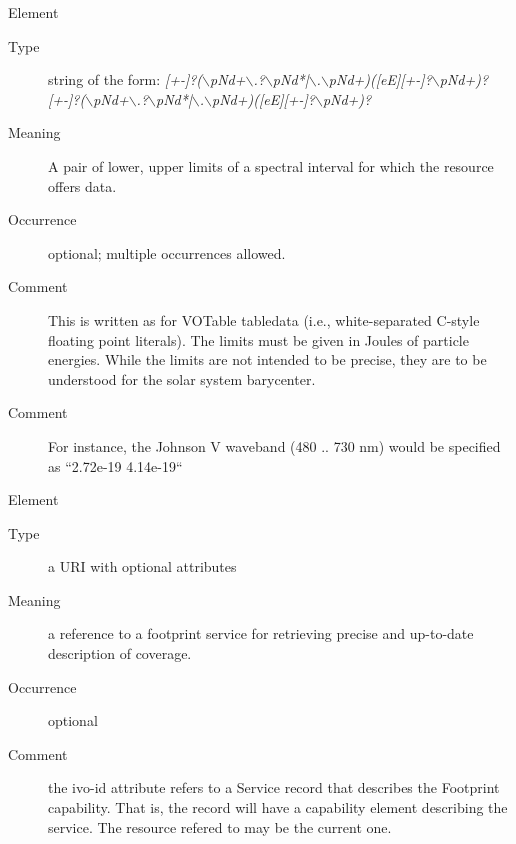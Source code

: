 \documentclass[11pt,a4paper]{ivoa}
\begin{document}
\begin{generated}
\begin{bigdescription}
\begin{description}
\end{description}
\item[Element \xmlel{spectral}]
\begin{description}
\item[Type] string of the form: \emph{[+-]?($\backslash$p{Nd}+$\backslash$.?$\backslash$p{Nd}*|$\backslash$.$\backslash$p{Nd}+)([eE][+-]?$\backslash$p{Nd}+)? [+-]?($\backslash$p{Nd}+$\backslash$.?$\backslash$p{Nd}*|$\backslash$.$\backslash$p{Nd}+)([eE][+-]?$\backslash$p{Nd}+)?}
\item[Meaning] 
                  A pair of lower, upper limits of a spectral interval 
                  for which the resource offers data.
               
\item[Occurrence] optional; multiple occurrences allowed.

\item[Comment] 
                  This is written as for VOTable tabledata (i.e., 
                  white-separated C-style floating point literals).
                  The limits must be given in Joules of particle
                  energies.  While the limits are not intended 
                  to be precise, they are to be understood for the
                  solar system barycenter.
               
\item[Comment] 
                  For instance, the Johnson V waveband (480 .. 730 nm)
                  would be specified as “2.72e-19 4.14e-19“
               

\end{description}
\item[Element \xmlel{footprint}]
\begin{description}
\item[Type] a URI with optional attributes
\item[Meaning] 
                  a reference to a footprint service for retrieving 
                  precise and up-to-date description of coverage.  
               
\item[Occurrence] optional
\item[Comment] 
                  the ivo-id attribute refers to a Service record
                  that describes the Footprint capability.  That is,
                  the record will have a capability element describing
                  the service.  The resource refered to may be the 
                  current one.  
               


\end{description}
\end{bigdescription}
\end{generated}
\end{document}
